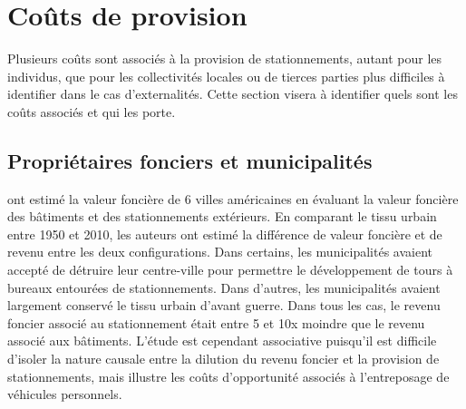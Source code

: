 \section{Coûts de provision}
Plusieurs coûts sont associés à la provision de stationnements, autant pour les individus, que pour les collectivités locales ou de tierces parties plus difficiles à identifier dans le cas d'externalités. Cette section visera à identifier quels sont les coûts associés et qui les porte.

\subsection{Propriétaires fonciers et municipalités}
\textcite{Blanc:EffectsUrban:2014} ont estimé la valeur foncière de 6 villes américaines en évaluant la valeur foncière des bâtiments et des stationnements extérieurs. En comparant le tissu urbain entre 1950 et 2010, les auteurs ont estimé la différence de valeur foncière et de revenu entre les deux configurations. Dans certains, les municipalités avaient accepté de détruire leur centre-ville pour permettre le développement de tours à bureaux entourées de stationnements. Dans d'autres, les municipalités avaient largement conservé le tissu urbain d'avant guerre. Dans tous les cas, le revenu foncier associé au stationnement était entre 5 et 10x moindre que le revenu associé aux bâtiments. L'étude est cependant associative puisqu'il est difficile d'isoler la nature causale entre la dilution du revenu foncier et la provision de stationnements, mais illustre les coûts d'opportunité associés à l'entreposage de véhicules personnels. \par

